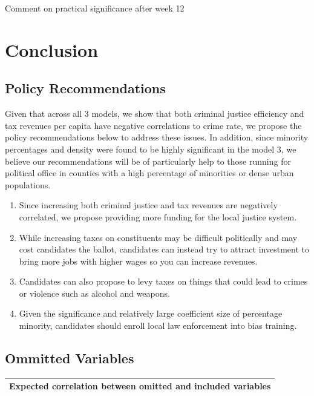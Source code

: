 \documentclass[]{article}
\begin{document}
Comment on practical significance after week 12

\hypertarget{conclusion}{%
\section{Conclusion}\label{conclusion}}

\hypertarget{policy-recommendations}{%
\subsection{Policy Recommendations}\label{policy-recommendations}}

Given that across all 3 models, we show that both criminal justice
efficiency and tax revenues per capita have negative correlations to
crime rate, we propose the policy recommendations below to address these
issues. In addition, since minority percentages and density were found
to be highly significant in the model 3, we believe our recommendations
will be of particularly help to those running for political office in
counties with a high percentage of minorities or dense urban
populations.

\begin{enumerate}
\def\labelenumi{\arabic{enumi}.}
\item
  Since increasing both criminal justice and tax revenues are negatively
  correlated, we propose providing more funding for the local justice
  system.
\item
  While increasing taxes on constituents may be difficult politically
  and may cost candidates the ballot, candidates can instead try to
  attract investment to bring more jobs with higher wages so you can
  increase revenues.
\item
  Candidates can also propose to levy taxes on things that could lead to
  crimes or violence such as alcohol and weapons.
\item
  Given the significance and relatively large coefficient size of
  percentage minority, candidates should enroll local law enforcement
  into bias training.
\end{enumerate}

\hypertarget{ommitted-variables}{%
\subsection{Ommitted Variables}\label{ommitted-variables}}

\begin{longtable}[]{@{}l@{}}
\toprule
Expected correlation between omitted and included
variables\tabularnewline
\midrule
\endhead
\bottomrule
\end{longtable}
\end{document}
